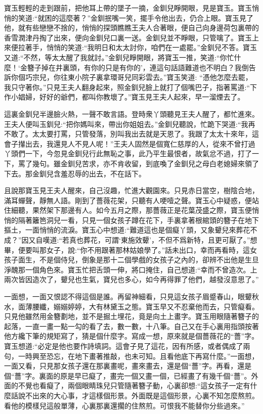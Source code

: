 \begin{parag}
    寶玉輕輕的走到跟前，把他耳上帶的墜子一摘，金釧兒睜開眼，見是寶玉。寶玉悄悄的笑道:“就困的這麼著？”金釧抿嘴一笑，擺手令他出去，仍合上眼。寶玉見了他，就有些戀戀不捨的，悄悄的探頭瞧瞧王夫人合著眼，便自己向身邊荷包裏帶的香雪潤津丹掏了出來，便向金釧兒口裏一送。金釧兒並不睜眼，只管噙了。寶玉上來便拉著手，悄悄的笑道:“我明日和太太討你，咱們在一處罷。”金釧兒不答。寶玉又道:“不然，等太太醒了我就討。”金釧兒睜開眼，將寶玉一推，笑道:“你忙什麼！‘金簪子掉在井裏頭，有你的只是有你的’，連這句話語難道也不明白？我倒告訴你個巧宗兒，你往東小院子裏拿環哥兒同彩雲去。”寶玉笑道: “憑他怎麼去罷，我只守著你。”只見王夫人翻身起來，照金釧兒臉上就打了個嘴巴子，指著罵道:“下作小娼婦，好好的爺們，都叫你教壞了。”寶玉見王夫人起來，早一溜煙去了。
\end{parag}


\begin{parag}
    這裏金釧兒半邊臉火熱，一聲不敢言語。登時衆丫頭聽見王夫人醒了，都忙進來。王夫人便叫玉釧兒:“把你媽叫來，帶出你姐姐去。”金釧兒聽說，忙跪下哭道:“我再不敢了。太太要打罵，只管發落，別叫我出去就是天恩了。我跟了太太十來年，這會子攆出去，我還見人不見人呢！”王夫人固然是個寬仁慈厚的人，從來不曾打過丫頭們一下，今忽見金釧兒行此無恥之事，此乃平生最恨者，故氣忿不過，打了一下，罵了幾句。雖金釧兒苦求，亦不肯收留，到底喚了金釧兒之母白老媳婦來領了下去。那金釧兒含羞忍辱的出去，不在話下。
\end{parag}


\begin{parag}
    且說那寶玉見王夫人醒來，自己沒趣，忙進大觀園來。只見赤日當空，樹陰合地，滿耳蟬聲，靜無人語。剛到了薔薇花架，只聽有人哽噎之聲。寶玉心中疑惑，便站住細聽，果然架下那邊有人。如今五月之際，那薔薇正是花葉茂盛之際，寶玉便悄悄的隔著籬笆洞兒一看，只見一個女孩子蹲在花下，手裏拿著根綰頭的簪子在地下摳土，一面悄悄的流淚。寶玉心中想道:“難道這也是個癡丫頭，又象顰兒來葬花不成？”因又自嘆道:“若真也葬花，可謂‘東施效顰’，不但不爲新特，且更可厭了。”想畢，便要叫那女子，說:“你不用跟著那林姑娘學了。”話未出口，幸而再看時，這女孩子面生，不是個侍兒，倒象是那十二個學戲的女孩子之內的，卻辨不出他是生旦淨醜那一個角色來。寶玉忙把舌頭一伸，將口掩住，自己想道:“幸而不曾造次。上兩次皆因造次了，顰兒也生氣，寶兒也多心，如今再得罪了他們，越發沒意思了。”
\end{parag}


\begin{parag}
    一面想，一面又恨認不得這個是誰。再留神細看，只見這女孩子眉蹙春山，眼顰秋水，面薄腰纖，嫋嫋婷婷，大有林黛玉之態。寶玉早又不忍棄他而去，只管癡看。只見他雖然用金簪劃地，並不是掘土埋花，竟是向土上畫字。寶玉用眼隨著簪子的起落，一直一畫一點一勾的看了去，數一數，十八筆。自己又在手心裏用指頭按著他方纔下筆的規矩寫了，猜是個什麼字。寫成一想，原來就是個薔薇花的“薔”字。寶玉想道:“必定是他也要作詩填詞。這會子見了這花，因有所感，或者偶成了兩句，一時興至恐忘，在地下畫著推敲，也未可知。且看他底下再寫什麼。”一面想，一面又看，只見那女孩子還在那裏畫呢，畫來畫去，還是個“薔”字。再看，還是個“薔”字。裏面的原是早已癡了，畫完一個又畫一個，已經畫了有幾千個“薔”。外面的不覺也看癡了，兩個眼睛珠兒只管隨著簪子動，心裏卻想:“這女孩子一定有什麼話說不出來的大心事，才這樣個形景。外面既是這個形景，心裏不知怎麼熬煎。看他的模樣兒這般單薄，心裏那裏還擱的住熬煎。可恨我不能替你分些過來。”
\end{parag}


